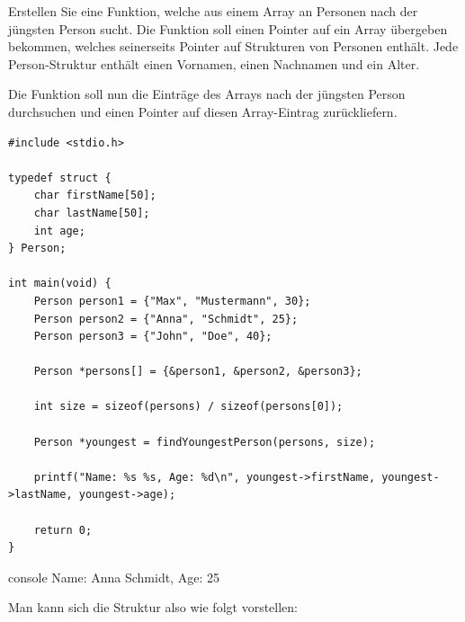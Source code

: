 \vspace{10pt}

Erstellen Sie eine Funktion, welche aus einem Array an Personen nach der
jüngsten Person sucht. Die Funktion soll einen Pointer auf ein Array übergeben
bekommen, welches seinerseits Pointer auf Strukturen von Personen enthält. Jede
Person-Struktur enthält einen Vornamen, einen Nachnamen und ein Alter.

Die Funktion soll nun die Einträge des Arrays nach der jüngsten Person
durchsuchen und einen Pointer auf diesen Array-Eintrag zurückliefern.

\Vorlage
\begin{verbatim}
#include <stdio.h>

typedef struct {
    char firstName[50];
    char lastName[50];
    int age;
} Person;

int main(void) {
    Person person1 = {"Max", "Mustermann", 30};
    Person person2 = {"Anna", "Schmidt", 25};
    Person person3 = {"John", "Doe", 40};

    Person *persons[] = {&person1, &person2, &person3};

    int size = sizeof(persons) / sizeof(persons[0]);

    Person *youngest = findYoungestPerson(persons, size);

    printf("Name: %s %s, Age: %d\n", youngest->firstName, youngest->lastName, youngest->age);

    return 0;
}
\end{verbatim}

\begin{mybox}[Bildschirmausgabe]{console}
Name: Anna Schmidt, Age: 25
\end{mybox}


Man kann sich die Struktur also wie folgt vorstellen:

